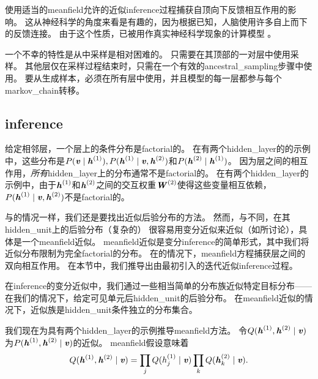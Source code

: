 
使用适当的\gls{meanfield}允许的近似\gls{inference}过程捕获自顶向下反馈相互作用的影响。
这从神经科学的角度来看是有趣的，因为根据已知，人脑使用许多自上而下的反馈连接。
由于这个性质，已被用作真实神经科学现象的计算模型 \citep{series2010hallucinations,reichert2011neuronal}。


一个不幸的特性是从中采样是相对困难的。
只需要在其顶部的一对层中使用采样。
其他层仅在采样过程结束时，只需在一个有效的\gls{ancestral_sampling}步骤中使用。
要从生成样本，必须在所有层中使用，并且模型的每一层都参与每个\gls{markov_chain}转移。


\subsection{\gls{inference}}
\label{sec:dbm_mean_field_inference}
给定相邻层，一个层上的条件分布是\gls{factorial}的。
在有两个\gls{hidden_layer}的的示例中，这些分布是$P(\boldsymbol{\mathit{v}}  \mid  \boldsymbol{\mathit{h}}^{(1)}), P(\boldsymbol{\mathit{h}}^{(1)}  \mid  \boldsymbol{\mathit{v}}, \boldsymbol{\mathit{h}}^{(2)})$和$P(\boldsymbol{\mathit{h}}^{(2)}  \mid  \boldsymbol{\mathit{h}}^{(1)})$。
因为层之间的相互作用，\emph{所有}\gls{hidden_layer}上的分布通常不是\gls{factorial}的。
在有两个\gls{hidden_layer}的示例中，由于$\boldsymbol{\mathit{h}}^{(1)}$和$\boldsymbol{\mathit{h}}^{(2)}$之间的交互权重$\boldsymbol{\mathit{W}}^{(2)}$使得这些变量相互依赖， $ P(\boldsymbol{\mathit{h}}^{(1)}  \mid  \boldsymbol{\mathit{v}}, \boldsymbol{\mathit{h}}^{(2)})$不是\gls{factorial}的。


与的情况一样，我们还是要找出近似后验分布的方法。
然而，与不同，在其\gls{hidden_unit}上的后验分布（复杂的） 很容易用变分近似来近似（如所讨论），具体是一个\gls{meanfield}近似。
\gls{meanfield}近似是变分\gls{inference}的简单形式，其中我们将近似分布限制为完全\gls{factorial}的分布。
在的情况下，\gls{meanfield}方程捕获层之间的双向相互作用。
在本节中，我们推导出由\cite{SalHinton09}最初引入的迭代近似\gls{inference}过程。


在\gls{inference}的变分近似中，我们通过一些相当简单的分布族近似特定目标分布——在我们的情况下，给定可见单元后\gls{hidden_unit}的后验分布。
在\gls{meanfield}近似的情况下，近似族是\gls{hidden_unit}条件独立的分布集合。


我们现在为具有两个\gls{hidden_layer}的示例推导\gls{meanfield}方法。
令$Q(\boldsymbol{\mathit{h}}^{(1)}, \boldsymbol{\mathit{h}}^{(2)}  \mid  \boldsymbol{\mathit{v}})$为$P(\boldsymbol{\mathit{h}}^{(1)}, \boldsymbol{\mathit{h}}^{(2)}  \mid  \boldsymbol{\mathit{v}})$的近似。
\gls{meanfield}假设意味着
\begin{align}
 Q(\boldsymbol{\mathit{h}}^{(1)}, \boldsymbol{\mathit{h}}^{(2)}  \mid  \boldsymbol{\mathit{v}}) = \prod_j Q(h_j^{(1)} \mid  \boldsymbol{\mathit{v}}) \prod_k Q(\boldsymbol{\mathit{h}}_k^{(2)}  \mid  \boldsymbol{\mathit{v}}).
\end{align}

